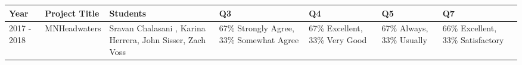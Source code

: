 
\begin{longtable}{p{1cm}p{2.5cm}p{3cm}p{2cm}p{2cm}p{2cm}p{2cm}}
Year & Project Title & Students & Q3 & Q4 & Q5 & Q7\\
\hline 
\endhead 
2017 - 2018 & MNHeadwaters & Sravan Chalasani , Karina Herrera, John Sisser, Zach Voss & 67\% Strongly Agree, 33\% Somewhat Agree & 67\% Excellent, 33\% Very Good & 67\% Always, 33\% Usually & 66\% Excellent, 33\% Satisfactory \\
\end{longtable}

